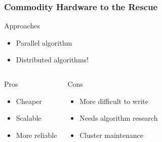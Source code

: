 \begin{frame}
 \frametitle{Commodity Hardware to the Rescue}
\begin{block}{Approaches}
\begin{itemize}
\item Parallel algorithm
\item Distributed algorithms!
\end{itemize}
\end{block}


\begin{columns} 
\begin{block}{Pros}
\begin{itemize}
 \item Cheaper
 \item Scalable
 \item More reliable
\end{itemize}
\end{block}

\begin{block}{Cons}
\begin{itemize}
  \item More difficult to write
  \item Needs algorithm research
  \item Cluster maintenance
\end{itemize} 
\end{block}
\end{columns}
\end{frame}
